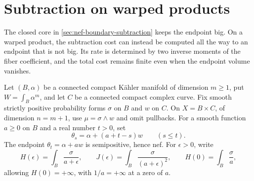 \section{Subtraction on warped products}
\label{sec:warped-endpoint-subtraction}

The closed core in \cref{sec:nef-boundary-subtraction} keeps the endpoint big. On a warped product, the subtraction cost can instead be computed all the way to an endpoint that is not big. Its rate is determined by two inverse moments of the fiber coefficient, and the total cost remains finite even when the endpoint volume vanishes.

Let $(B,\alpha)$ be a connected compact K\"ahler manifold of dimension $m\geq1$, put $W=\int_B\alpha^m$, and let $C$ be a connected compact complex curve. Fix smooth strictly positive probability forms $\sigma$ on $B$ and $w$ on $C$. On $X=B\times C$, of dimension $n=m+1$, use $\mu=\sigma\wedge w$ and omit pullbacks. For a smooth function $a\geq0$ on $B$ and a real number $t>0$, set
\[
 \theta_s=\alpha+(a+t-s)w\qquad(s\leq t).
\]
The endpoint $\theta_t=\alpha+aw$ is semipositive, hence nef. For $\epsilon>0$, write
\[
 H(\epsilon)=\int_B\frac{\sigma}{a+\epsilon},\qquad
 J(\epsilon)=\int_B\frac{\sigma}{(a+\epsilon)^2},\qquad
 H(0)=\int_B\frac{\sigma}{a},
\]
allowing $H(0)=+\infty$, with $1/a=+\infty$ at a zero of $a$.

